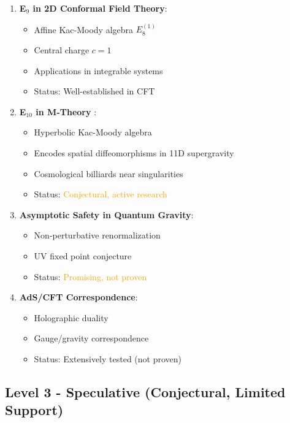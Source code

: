 \begin{enumerate}
    \item \textbf{E$_9$ in 2D Conformal Field Theory}:
    \begin{itemize}
        \item Affine Kac-Moody algebra $E_8^{(1)}$
        \item Central charge $c = 1$
        \item Applications in integrable systems \cite{kac1990infinite}
        \item Status: \textcolor{validcolor}{Well-established in CFT}
    \end{itemize}

    \item \textbf{E$_{10}$ in M-Theory} \cite{damour2002e10}:
    \begin{itemize}
        \item Hyperbolic Kac-Moody algebra
        \item Encodes spatial diffeomorphisms in 11D supergravity
        \item Cosmological billiards near singularities
        \item Status: \textcolor{orange}{Conjectural, active research}
    \end{itemize}

    \item \textbf{Asymptotic Safety in Quantum Gravity}:
    \begin{itemize}
        \item Non-perturbative renormalization
        \item UV fixed point conjecture
        \item Status: \textcolor{orange}{Promising, not proven}
    \end{itemize}

    \item \textbf{AdS/CFT Correspondence}:
    \begin{itemize}
        \item Holographic duality
        \item Gauge/gravity correspondence
        \item Status: \textcolor{validcolor}{Extensively tested (not proven)}
    \end{itemize}
\end{enumerate}

\subsection{Level 3 - Speculative (Conjectural, Limited Support)}

